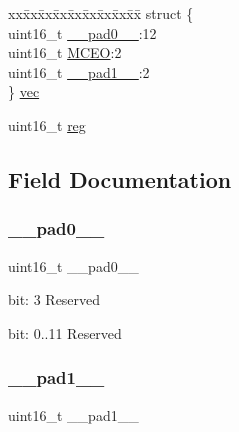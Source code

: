 \begin{DoxyCompactItemize}
\begin{tabbing}
\end{tabbing}\item 
\begin{tabbing}
xx\=xx\=xx\=xx\=xx\=xx\=xx\=xx\=xx\=\kill
struct \{\\
\>uint16\_t \mbox{\hyperlink{union_t_c___e_v_c_t_r_l___type_a77132c2c26a75f5b8751b235cda23828}{\_\_pad0\_\_}}:12\\
\>uint16\_t \mbox{\hyperlink{union_t_c___e_v_c_t_r_l___type_a751f7e11e152488e5f2d3e8eb9220563}{MCEO}}:2\\
\>uint16\_t \mbox{\hyperlink{union_t_c___e_v_c_t_r_l___type_ab72e3a1f2f7db8695c60c658f5a0f11a}{\_\_pad1\_\_}}:2\\
\} \mbox{\hyperlink{union_t_c___e_v_c_t_r_l___type_a603dc73568af5c61f7e5731b4edbb877}{vec}}\\

\end{tabbing}\item 
uint16\+\_\+t \mbox{\hyperlink{union_t_c___e_v_c_t_r_l___type_a11760f5020019f4aa8cb02e694f7cc44}{reg}}
\end{DoxyCompactItemize}


\subsection{Field Documentation}
\mbox{\label{union_t_c___e_v_c_t_r_l___type_a77132c2c26a75f5b8751b235cda23828}} 
\subsubsection{\texorpdfstring{\_\_pad0\_\_}{\_\_pad0\_\_}}
{\footnotesize\ttfamily uint16\+\_\+t \+\_\+\+\_\+pad0\+\_\+\+\_\+}

bit\+: 3 Reserved

bit\+: 0..11 Reserved \mbox{\label{union_t_c___e_v_c_t_r_l___type_ab72e3a1f2f7db8695c60c658f5a0f11a}} 
\subsubsection{\texorpdfstring{\_\_pad1\_\_}{\_\_pad1\_\_}}
{\footnotesize\ttfamily uint16\+\_\+t \+\_\+\+\_\+pad1\+\_\+\+\_\+}

